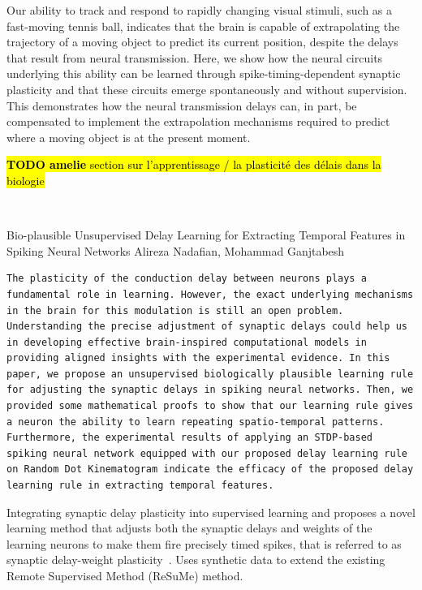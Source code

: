 \documentclass[brainsci, %
               review,submit,pdftex,moreauthors%
               ]{Definitions/mdpi}
\newcommand{\note}[1]{{\sethlcolor{yellow}\hl{#1}}}
\begin{document}
Our ability to track and respond to rapidly changing visual stimuli, such as a fast-moving tennis ball, indicates that the brain is capable of extrapolating the trajectory of a moving object to predict its current position, despite the delays that result from neural transmission. Here, we show how the neural circuits underlying this ability can be learned through spike-timing-dependent synaptic plasticity and that these circuits emerge spontaneously and without supervision. This demonstrates how the neural transmission delays can, in part, be compensated to implement the extrapolation mechanisms required to predict where a moving object is at the present moment.~\citep{burkitt_predictive_2021}

\note{\textbf{TODO amelie} section sur l'apprentissage / la plasticité des délais dans la biologie}



~\citep{nadafian_bio-plausible_2020}


Bio-plausible Unsupervised Delay Learning for Extracting Temporal Features in Spiking Neural Networks
Alireza Nadafian, Mohammad Ganjtabesh

\begin{verbatim}
The plasticity of the conduction delay between neurons plays a fundamental role in learning. However, the exact underlying mechanisms in the brain for this modulation is still an open problem. Understanding the precise adjustment of synaptic delays could help us in developing effective brain-inspired computational models in providing aligned insights with the experimental evidence. In this paper, we propose an unsupervised biologically plausible learning rule for adjusting the synaptic delays in spiking neural networks. Then, we provided some mathematical proofs to show that our learning rule gives a neuron the ability to learn repeating spatio-temporal patterns. Furthermore, the experimental results of applying an STDP-based spiking neural network equipped with our proposed delay learning rule on Random Dot Kinematogram indicate the efficacy of the proposed delay learning rule in extracting temporal features.
\end{verbatim}

Integrating synaptic delay plasticity into supervised learning and proposes a novel learning method that adjusts both the synaptic delays and weights of the learning neurons to make them fire precisely timed spikes, that is referred to as synaptic delay-weight plasticity~\citep{zhang_supervised_2020}. Uses synthetic data to extend the existing Remote Supervised Method (ReSuMe) method.
\end{document}
